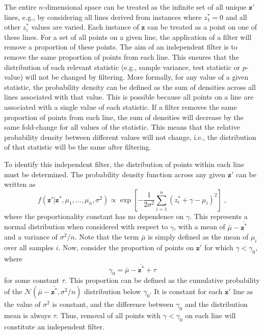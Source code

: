\documentclass{article}
\newcommand{\nsamples}{n}
\newcommand{\sample}{i}
\newcommand{\normal}{\mathcal{N}}
\newcommand{\normean}{\mu}
\newcommand{\normvar}{\sigma^2}
\newcommand{\modifier}{\gamma}
\newcommand{\logcount}{z}
\newcommand{\oriobs}[0]{\mathbf{\logcount}}
\newcommand{\modobs}[0]{\mathbf{\logcount}'}
\newcommand{\instance}[0]{\mathbf{\logcount}^*}
\newcommand{\threshold}{\tau}
\begin{document}
The entire $\nsamples$-dimensional space can be treated as the infinite set of all unique $\modobs$ lines, e.g., by considering all lines derived from instances where $\logcount^*_1=0$ and all other $\logcount^*_\sample$ values are varied.
Each instance of $\oriobs$ can be treated as a point on one of these lines.
For a set of all points on a given line, the application of a filter will remove a proportion of these points.
The aim of an independent filter is to remove the same proportion of points from each line. 
This ensures that the distribution of each relevant statistic (e.g., sample variance, test statistic or $p$-value) will not be changed by filtering.
More formally, for any value of a given statistic, the probability density can be defined as the sum of densities across all lines associated with that value.
This is possible because all points on a line are associated with a single value of each statistic.
If a filter removes the same proportion of points from each line, the sum of densities will decrease by the same fold-change for all values of the statistic.
This means that the relative probability density between different values will not change, i.e., the distribution of that statistic will be the same after filtering.

To identify this independent filter, the distribution of points within each line must be determined. 
The probability density function across any given $\modobs$ can be written as
\[
f(\modobs | \instance, \normean_1, ..., \normean_\nsamples, \normvar) \propto \exp\left[-\frac{1}{2\normvar} \sum_{\sample=1}^\nsamples (\logcount^*_\sample + \modifier - \normean_\sample)^2 \right] \;,
\]
where the proportionality constant has no dependence on $\modifier$. 
This represents a normal distribution when considered with respect to $\modifier$, with a mean of $\bar\normean - \bar{\instance}$ and a variance of $\normvar/\nsamples$. 
Note that the term $\bar\normean$ is simply defined as the mean of $\normean_\sample$ over all samples $\sample$.
Now, consider the proportion of points on $\modobs$ for which $\modifier < \modifier_0$, where 
\[
 \modifier_0 = \bar\normean - \bar{\instance} + \threshold
\]
for some constant $\threshold$. 
This proportion can be defined as the cumulative probability of the $\normal(\bar\normean - \bar{\instance}, \normvar/\nsamples)$ distribution below $\modifier_0$.
It is constant for each $\modobs$ line as the value of $\normvar$ is constant, and the difference between $\modifier_0$ and the distribution mean is always $\threshold$.
Thus, removal of all points with $\modifier < \modifier_0$ on each line will constitute an independent filter.
\end{document}
